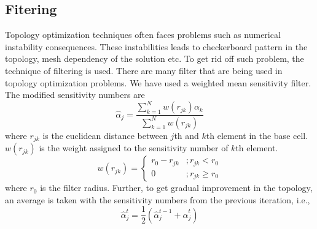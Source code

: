 \documentclass[10pt]{article}
\begin{document}
\subsection{Fitering}
Topology optimization techniques often faces problems such as numerical instability consequences. These instabilities leads to checkerboard pattern in the topology, mesh dependency of the solution etc. To get rid off such problem, the technique of filtering is used. There are many filter that are being used in topology optimization problems. We have used a weighted mean sensitivity filter. The modified sensitivity numbers are 
\begin{equation}
\label{eq:wmfilter}
\hat\alpha_j = \frac{\sum_{k=1}^{N}w(r_{jk})\alpha_k}{\sum_{k=1}^Nw(r_{jk})}
\end{equation}
where $r_{jk}$ is the euclidean distance between $j$th and $k$th element in the base cell. $w(r_{jk})$ is the weight assigned to the sensitivity number of $k$th element.
\begin{equation}
w(r_{jk}) = 
\begin{cases}
r_0 - r_{jk} &; r_{jk}<r_0\\
0 &; r_{jk}\geq r_0
\end{cases}
\end{equation}
where $r_0$ is the filter radius. 
Further, to get gradual improvement in the topology, an average is taken with the sensitivity numbers from the previous iteration, i.e.,
\begin{equation}
\hat\alpha^t_j = \frac{1}{2}(\hat\alpha^{t-1}_j+\hat\alpha^t_j)
\end{equation}
\end{document}
